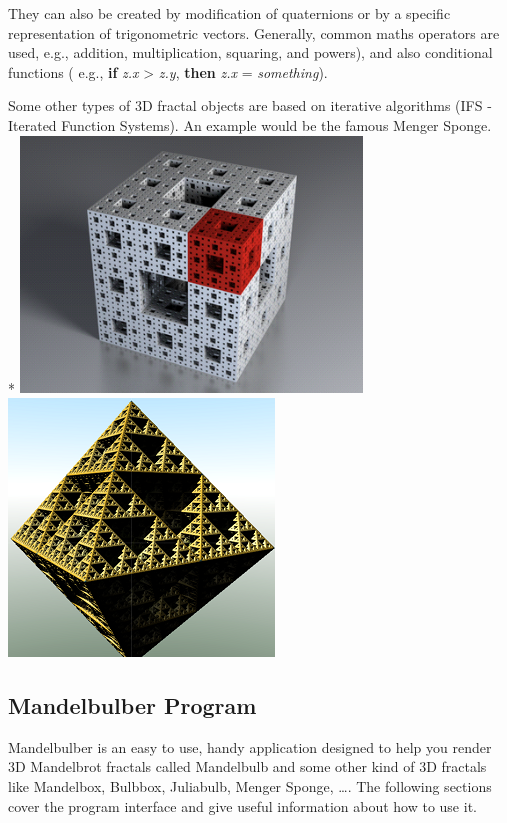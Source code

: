 They can also be created by modification of quaternions or by a specific
representation of trigonometric vectors. Generally, common maths
operators are used, e.g., addition, multiplication, squaring, and
powers), and also conditional functions ( e.g., \textbf{if} \emph{z.x} \textgreater{}
\emph{z.y}, \textbf{then} \emph{z.x} = \emph{something}).

Some other types of 3D fractal objects are based on iterative algorithms
(IFS - Iterated Function Systems). An example would be the famous Menger
Sponge.\\*
\includegraphics[width=3.57768in,height=2.68571in]{img/manual/media/image2.png}
\includegraphics[width=2.77917in,height=2.69792in]{img/manual/media/image3.png}

\subsection{Mandelbulber Program}\label{mandelbulber-program}

Mandelbulber is an easy to use, handy application designed to help you
render 3D Mandelbrot fractals called Mandelbulb and some other kind of
3D fractals like Mandelbox, Bulbbox, Juliabulb, Menger Sponge, \ldots{}.
The following sections cover the program interface and give useful
information about how to use it.

